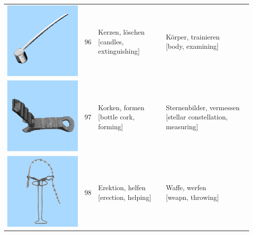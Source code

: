 \documentclass[
  english,
  doc,12pt,twoside,floatsintext]{apa7}
\begin{document}
\begin{center}
\begin{ThreePartTable}
{\begin{longtable}{llll}
\includegraphics[valign=c, scale=0.23]{../materials/unfamiliar/96.png} & 96 & \makecell[l]{Kerzen, löschen\\{[candles, extinguishing]}} & \makecell[l]{Körper, trainieren\\{[body, examining]}}\\
\includegraphics[valign=c, scale=0.23]{../materials/unfamiliar/97.png} & 97 & \makecell[l]{Korken, formen\\{[bottle cork, forming]}} & \makecell[l]{Sternenbilder, vermessen\\{[stellar constellation, measuring]}}\\
\includegraphics[valign=c, scale=0.23]{../materials/unfamiliar/98.png} & 98 & \makecell[l]{Erektion, helfen\\{[erection, helping]}} & \makecell[l]{Waffe, werfen\\{[weapn, throwing]}}\\

\end{longtable}}
\end{ThreePartTable}
\end{center}
\end{document}
